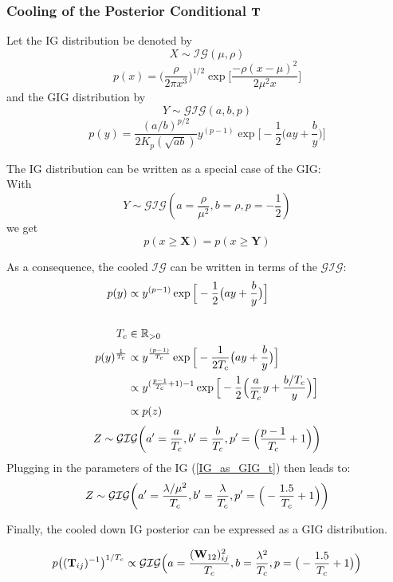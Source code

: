 \subsubsection{Cooling of the Posterior Conditional $\matr{T}$}
Let the \gls{IG} distribution be denoted by
$$
{X} \sim \mathcal{IG}(\mu, \rho)
$$
$$
p(x) = \Big(\frac{\rho}{2\pi x^3}\Big)^{1/2}\exp \Big[ \frac{-\rho(x-\mu)^2}{2\mu^2 x} \Big]
$$
and the \gls{GIG} distribution by
$$
{Y} \sim \mathcal{GIG}(a, b, p)
$$
$$
p(y) = \frac{(a/b)^{p/2}}{2K_p(\sqrt{ab})} y^{(p-1)} \exp\Big[-\frac{1}{2}\big(ay + \frac{b}{y}\big)\Big]
$$

The \gls{IG} distribution can be written as a special case of the \gls{GIG}:
\\
With  
\begin{equation}
{Y} \sim \mathcal{GIG}(a=\frac{\rho}{\mu^2}, b=\rho, p=-\frac{1}{2})
\label{IG_as_GIG_t}
\end{equation}
we get
$$p(x\geq\bm{X}) = p(x\geq\bm{Y})$$

As a consequence, the cooled $\mathcal{IG}$ can be written in terms of the $\mathcal{GIG}$:
\begin{align*}
p(y) &\propto
y^{(p-1)} \exp\Big[-\frac{1}{2}\big(ay + \frac{b}{y}\big)\Big]
\\
\\
T_{c} &\in \mathbb{R}_{>0}
\\
p(y)^\frac{1}{T_{c}} &\propto
y^{\frac{(p-1)}{T_{c}}} \exp\Big[-\frac{1}{2T_{c}}\big(ay + \frac{b}{y}\big)\Big]
\\
&\propto 
y^{(\frac{p-1}{T_{c}}+1)-1} \exp\Big[-\frac{1}{2}\Big(\frac{a}{T_{c}}y + \frac{b/T_{c}}{y}\Big)\Big]
\\
&\propto p(z)
\end{align*}
$$
{Z} \sim \mathcal{GIG}\bigg(a'=\frac{a}{T_{c}}, b'=\frac{b}{T_{c}}, p'=\Big(\frac{p-1}{T_{c}}+1\Big)\bigg)
$$
Plugging in the parameters of the \gls{IG} (\autoref{IG_as_GIG_t}) then leads to:
\begin{equation}
{Z} \sim \mathcal{GIG}\bigg(a'=\frac{\lambda/\mu^2}{T_{c}}, b'=\frac{\lambda}{T_{c}}, p'=\Big(-\frac{1.5}{T_{c}}+1\Big)\bigg)
\end{equation}

Finally, the cooled down \gls{IG} posterior can be expressed as a \gls{GIG} distribution. 
\begin{tcolorbox}[colback=red!5!white,colframe=red!60!black, title=Cooled Posterior Conditional of $\matr{T}$]
	
		\begin{align}
 				p\big((\mathbf{T}_{ij})^{-1}\big)^{1/T_{c}} \propto \mathcal{GIG}
\Big(
a = \frac{(\mathbf{W}_{12})_{ij}^2}{T_{c}} ,
b = \frac{\lambda^2}{T_{c}},
p = \big(-\frac{1.5}{T_{c}}+1\big)
\Big) 
		\end{align}
\end{tcolorbox}

